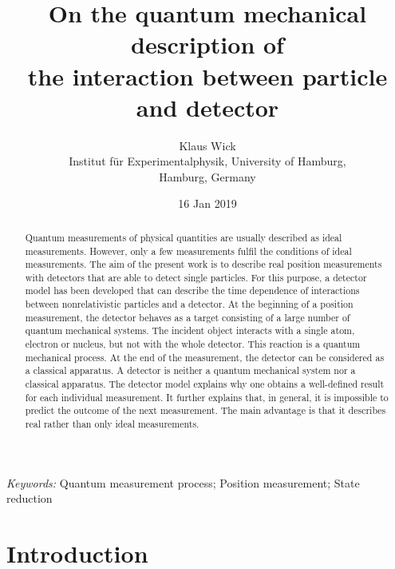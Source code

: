 \documentclass[12pt]{article}
\begin{document}

\title{On the quantum mechanical description of \\ 
the interaction between particle and detector}
\author{Klaus Wick \\ \small{Institut f\"ur Experimentalphysik, University of Hamburg,} \\ \small{Hamburg, Germany}}

\date{16 Jan 2019}
\maketitle

\begin{abstract}
Quantum measurements of physical quantities are usually described as ideal measurements. However, only a few measurements fulfil the conditions of ideal measurements.  The aim of the present work is to describe real position measurements with detectors that are able to detect single particles.  
For this purpose, a detector model has been developed that can describe the time dependence of interactions between nonrelativistic particles and a detector.  At the beginning of a position measurement, the detector behaves as a target consisting of a large number of quantum mechanical systems.  
The incident object interacts with a single atom, electron or nucleus, but not with the whole detector.  This reaction is a quantum mechanical process.  At the end of the measurement, the detector can be considered as a classical apparatus.  
A detector is neither a quantum mechanical system nor a classical apparatus. 
The detector model explains why one obtains a well-defined result for each individual measurement.  It further explains that, in general, it is impossible to predict the outcome of the next measurement.  
The main advantage is that it describes real rather than only ideal measurements. 
\end{abstract}

\emph{Keywords:} Quantum measurement process; Position measurement; State reduction  


\newpage

\section{Introduction} 
\end{document}
